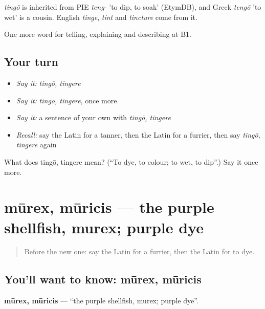 \begin{cousinweb}
\emph{tingō} is inherited from PIE \emph{teng-} 'to dip, to soak' (EtymDB), and Greek \emph{tengō} 'to wet' is a cousin. English \emph{tinge}, \emph{tint} and \emph{tincture} come from it.
\end{cousinweb}

\begin{grammarlens}[title={What you've built}]
One more word for telling, explaining and describing at B1.
\end{grammarlens}

\subsection*{Your turn}
\begin{itemize}
\raggedright
  \item \emph{Say it:} \emph{tingō, tingere}
  \item \emph{Say it:} \emph{tingō, tingere}, once more
  \item \emph{Say it:} a sentence of your own with \emph{tingō, tingere}
  \item \emph{Recall:} say the Latin for a tanner, then the Latin for a furrier, then say \emph{tingō, tingere} again
\end{itemize}

\begin{tcolorbox}[breakable,colback=teal!4,colframe=teal!35!black,title={Before you move on}]
What does tingō, tingere mean? (\textquotedblleft{}To dye, to colour; to wet, to dip\textquotedblright{}.) Say it once more.
\end{tcolorbox}
\section[mūrex, mūricis]{mūrex, mūricis — the purple shellfish, murex; purple dye}

\label{lesson:LA-C468-murex}



\begin{quote}
Before the new one: say the Latin for a furrier, then the Latin for to dye.
\end{quote}

\subsection*{You'll want to know: mūrex, mūricis}
\textbf{mūrex, mūricis} — \textquotedblleft{}the purple shellfish, murex; purple dye\textquotedblright{}.

